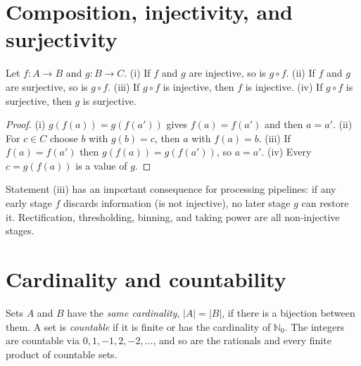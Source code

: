 \section{Composition, injectivity, and surjectivity}
\begin{proposition}
Let $f:A\to B$ and $g:B\to C$.
(i) If $f$ and $g$ are injective, so is $g\circ f$.
(ii) If $f$ and $g$ are surjective, so is $g\circ f$.
(iii) If $g\circ f$ is injective, then $f$ is injective.
(iv) If $g\circ f$ is surjective, then $g$ is surjective.
\end{proposition}
\begin{proof}
(i) $g(f(a))=g(f(a'))$ gives $f(a)=f(a')$ and then $a=a'$. (ii) For $c\in C$ choose $b$ with $g(b)=c$, then $a$ with $f(a)=b$. (iii) If $f(a)=f(a')$ then $g(f(a))=g(f(a'))$, so $a=a'$. (iv) Every $c=g(f(a))$ is a value of $g$.
\end{proof}
Statement (iii) has an important consequence for processing pipelines: if any early stage $f$ discards information (is not injective), no later stage $g$ can restore it. Rectification, thresholding, binning, and taking power are all non-injective stages.

\section{Cardinality and countability}
Sets $A$ and $B$ have the \emph{same cardinality}, $|A|=|B|$, if there is a bijection between them. A set is \emph{countable} if it is finite or has the cardinality of $\mathbb N_0$. The integers are countable via $0,1,-1,2,-2,\ldots$, and so are the rationals and every finite product of countable sets.

